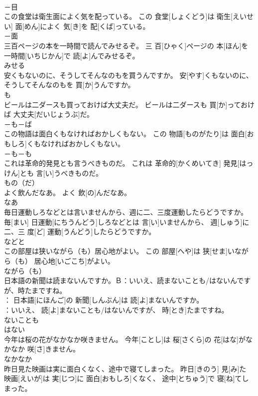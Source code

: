 \documentclass[8pt]{extreport}
\begin{document}
\begin{CJK}{UTF8}{min}
\\	－目	
\\	この食堂は衛生面によく気を配っている。	この 食堂[しょくどう]は 衛生[えいせい] 面[めん]によく 気[き]を 配[くば]っている。	
\\	－面	
\\	三百ページの本を一時間で読んでみせるぞ。	三 百[ひゃく]ページの 本[ほん]を 一時間[いちじかん]で 読[よ]んでみせるぞ。	
\\	みせる	
\\	安くもないのに、そうしてそんなのもを買うんですか。	安[やす]くもないのに、そうしてそんなのもを 買[か]うんですか。	
\\	も	
\\	ビールは二ダースも買っておけば大丈夫だ。	ビールは二ダースも 買[か]っておけば 大丈夫[だいじょうぶ]だ。	
\\	－も－ば	
\\	この物語は面白くもなければおかしくもない。	この 物語[ものがたり]は 面白[おもしろ]くもなければおかしくもない。	
\\	－も－も	
\\	これは革命的発見とも言うべきものだ。	これは 革命的[かくめいてき] 発見[はっけん]とも 言[い]うべきものだ。	
\\	もの（だ）	
\\	よく飲んだなあ。	よく 飲[の]んだなあ。	
\\	なあ	
\\	毎日運動しろなどとは言いませんから、週に二、三度運動したらどうですか。	毎[まい] 日運動[にちうんどう]しろなどとは 言[い]いませんから、 週[しゅう]に二、三 度[ど] 運動[うんどう]したらどうですか。	
\\	などと	
\\	この部屋は狭いながら（も）居心地がよい。	この 部屋[へや]は 狭[せま]いながら（も） 居心地[いごこち]がよい。	
\\	ながら（も）	
\\	日本語の新聞は読まないんですか。Ｂ：いいえ、読まないこと{も/は}ないんですが、時たまですね。	
\\	[えい]： 日本語[にほんご]の 新聞[しんぶん]は 読[よ]まないんですか。 
\\	[びー]：いいえ、 読[よ]まないこと{も/は}ないんですが、 時[とき]たまですね。	
\\	ないことも 
\\	はない	
\\	今年は桜の花がなかなか咲きません。	今年[ことし]は 桜[さくら]の 花[はな]がなかなか 咲[さ]きません。	
\\	なかなか	
\\	昨日見た映画は実に面白くなく、途中で寝てしまった。	昨日[きのう] 見[み]た 映画[えいが]は 実[じつ]に 面白[おもしろ]くなく、 途中[とちゅう]で 寝[ね]てしまった。	

\end{CJK}
\end{document}
